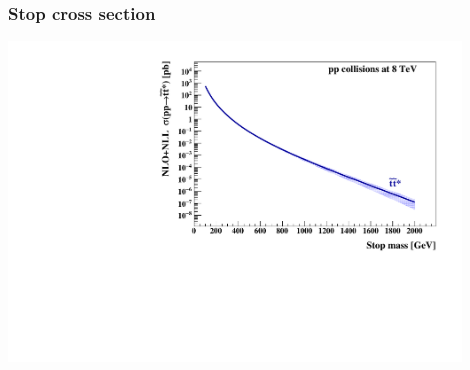 \documentclass[10pt, svgnames]{beamer}
\begin{document}
\begin{frame}
  \frametitle{Stop cross section}
  \begin{center}
    \includegraphics[width=0.9\textwidth]{figures/theory/xsec.pdf}
  \end{center}
\end{frame}
\end{document}
